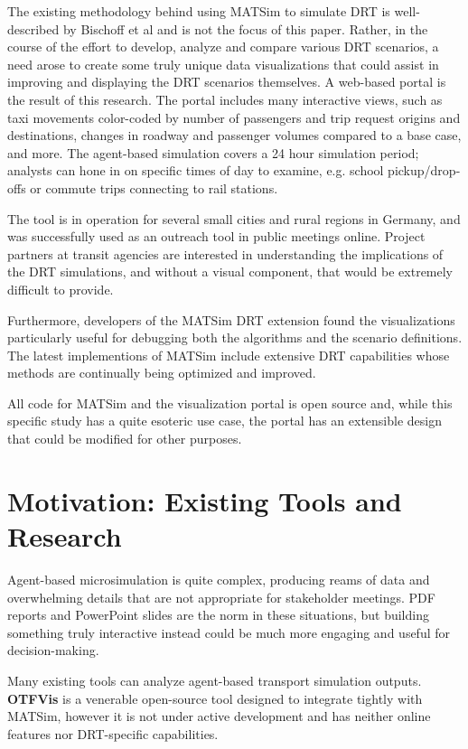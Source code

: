The existing methodology behind using MATSim to simulate DRT is well-described by Bischoff et al \cite{BischoffMaciejewskiNagel2017SharedTaxiIITSC} %
and is not the focus of this paper. Rather, in the course of the effort to develop, analyze and compare various DRT scenarios, a need arose to create some truly unique data visualizations that could assist in improving and displaying the DRT scenarios themselves. A web-based portal is the result of this research. The portal includes many interactive views, such as taxi movements color-coded by number of passengers and trip request origins and destinations, changes in roadway and passenger volumes compared to a base case, and more. The agent-based simulation covers a 24 hour simulation period; analysts can hone in on specific times of day to examine, e.g. school pickup/drop-offs or commute trips connecting to rail stations.

The tool is in operation for several small cities and rural regions in Germany, and was successfully used as an outreach tool in public meetings online. Project partners at transit agencies are interested in understanding the implications of the DRT simulations, and without a visual component, that would be extremely difficult to provide.

Furthermore, developers of the MATSim DRT extension found the visualizations particularly useful for debugging both the algorithms and the scenario definitions. The latest implementions of MATSim include extensive DRT capabilities whose methods are continually being optimized and improved.

All code for MATSim and the visualization portal is open source and, while this specific study has a quite esoteric use case, the portal has an extensible design that could be modified for other purposes.

\section{Motivation: Existing Tools and Research}
\label{motivation}

Agent-based microsimulation is quite complex, producing reams of data and overwhelming details that are not appropriate for stakeholder meetings. PDF reports and PowerPoint slides are the norm in these situations, but building something truly interactive instead could be much more engaging and useful for decision-making.

Many existing tools can analyze agent-based transport simulation outputs. \textbf{OTFVis} \cite{Srippgen2015OTFVisInBook} is a venerable open-source tool designed to integrate tightly with MATSim, however it is not under active development and has neither online features nor DRT-specific capabilities.

